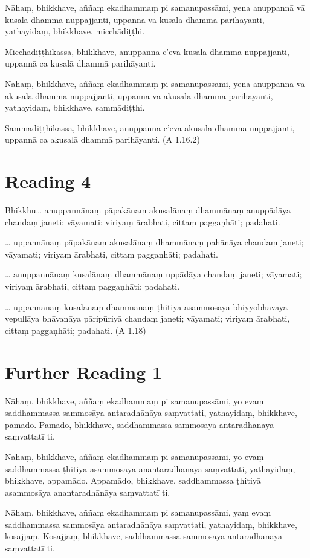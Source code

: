 Nāhaṃ, bhikkhave, aññaṃ ekadhammaṃ pi samanupassāmi, yena anuppannā vā kusalā dhammā nūppajjanti, uppannā vā kusalā dhammā parihāyanti, yathayidaṃ, bhikkhave, micchādiṭṭhi.

Micchādiṭṭhikassa, bhikkhave, anuppannā c’eva kusalā dhammā nūppajjanti, uppannā ca kusalā dhammā parihāyanti.

Nāhaṃ, bhikkhave, aññaṃ ekadhammaṃ pi samanupassāmi, yena anuppannā vā akusalā dhammā nūppajjanti, uppannā vā akusalā dhammā parihāyanti, yathayidaṃ, bhikkhave, sammādiṭṭhi.

Sammādiṭṭhikassa, bhikkhave, anuppannā c’eva akusalā dhammā nūppajjanti, uppannā ca akusalā dhammā parihāyanti. \hfill(A 1.16.2)

\section*{Reading 4}

Bhikkhu… anuppannānaṃ pāpakānaṃ akusalānaṃ dhammānaṃ anuppādāya chandaṃ janeti; vāyamati; viriyaṃ ārabhati, cittaṃ paggaṇhāti; padahati.

… uppannānaṃ pāpakānaṃ akusalānaṃ dhammānaṃ pahānāya chandaṃ janeti; vāyamati; viriyaṃ ārabhati, cittaṃ paggaṇhāti; padahati.

… anuppannānaṃ kusalānaṃ dhammānaṃ uppādāya chandaṃ janeti; vāyamati; viriyaṃ ārabhati, cittaṃ paggaṇhāti; padahati.

… uppannānaṃ kusalānaṃ dhammānaṃ ṭhitiyā asammosāya bhiyyobhāvāya vepullāya bhāvanāya pāripūriyā chandaṃ janeti; vāyamati; viriyaṃ ārabhati, cittaṃ paggaṇhāti; padahati. \hfill(A 1.18)

\section*{Further Reading 1}

Nāhaṃ, bhikkhave, aññaṃ ekadhammaṃ pi samanupassāmi, yo evaṃ saddhammassa sammosāya antaradhānāya saṃvattati, yathayidaṃ, bhikkhave, pamādo. Pamādo, bhikkhave, saddhammassa sammosāya antaradhānāya saṃvattatī ti.

Nāhaṃ, bhikkhave, aññaṃ ekadhammaṃ pi samanupassāmi, yo evaṃ saddhammassa ṭhitiyā asammosāya anantaradhānāya saṃvattati, yathayidaṃ, bhikkhave, appamādo. Appamādo, bhikkhave, saddhammassa ṭhitiyā asammosāya anantaradhānāya saṃvattatī ti.

Nāhaṃ, bhikkhave, aññaṃ ekadhammaṃ pi samanupassāmi, yaṃ evaṃ saddhammassa sammosāya antaradhānāya saṃvattati, yathayidaṃ, bhikkhave, kosajjaṃ. Kosajjaṃ, bhikkhave, saddhammassa sammosāya antaradhānāya saṃvattatī ti.

